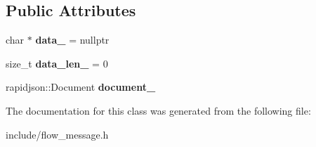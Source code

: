\subsection*{Public Attributes}
\begin{DoxyCompactItemize}
\item 
char $\ast$ {\bfseries data\+\_\+} = nullptr\hypertarget{classflow_1_1_flow_message_a793548a49940a5746fb52ae9f7d1901e}{}\label{classflow_1_1_flow_message_a793548a49940a5746fb52ae9f7d1901e}

\item 
size\+\_\+t {\bfseries data\+\_\+len\+\_\+} = 0\hypertarget{classflow_1_1_flow_message_aae3258bfbb03aeff9cf08ed70bb1ef5d}{}\label{classflow_1_1_flow_message_aae3258bfbb03aeff9cf08ed70bb1ef5d}

\item 
rapidjson\+::\+Document {\bfseries document\+\_\+}\hypertarget{classflow_1_1_flow_message_abd5b94cdbfc35c0c8361faa228c8bb62}{}\label{classflow_1_1_flow_message_abd5b94cdbfc35c0c8361faa228c8bb62}

\end{DoxyCompactItemize}


The documentation for this class was generated from the following file\+:\begin{DoxyCompactItemize}
\item 
include/flow\+\_\+message.\+h\end{DoxyCompactItemize}
